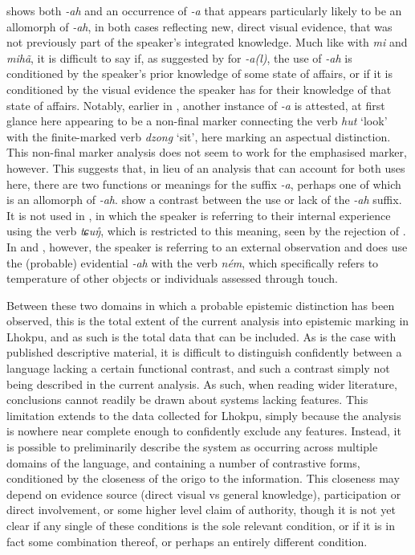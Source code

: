  shows both \textit{-ah} and an occurrence of \textit{-a} that appears particularly likely to be an allomorph of \textit{-ah}, in both cases reflecting new, direct visual evidence, that was not previously part of the speaker's integrated knowledge. Much like with \textit{mi} and \textit{mihã}, it is difficult to say if, as suggested by  for \textit{-a(l)}, the use of \textit{-ah} is conditioned by the speaker's prior knowledge of some state of affairs, or if it is conditioned by the visual evidence the speaker has for their knowledge of that state of affairs. Notably, earlier in , another instance of \textit{-a} is attested, at first glance here appearing to be a non-final marker connecting the verb \textit{hut} `look' with the finite-marked verb \textit{dzong} `sit', here marking an aspectual distinction. This non-final marker analysis does not seem to work for the emphasised marker, however. This suggests that, in lieu of an analysis that can account for both uses here, there are two functions or meanings for the suffix \textit{-a}, perhaps one of which is an allomorph of \textit{-ah}.  show a contrast between the use or lack of the \textit{-ah} suffix. It is not used in , in which the speaker is referring to their internal experience using the verb \textit{tɕuŋ̊}, which is restricted to this meaning, seen by the rejection of . In  and , however, the speaker is referring to an external observation and does use the (probable) evidential \textit{-ah} with the verb \textit{ném}, which specifically refers to temperature of other objects or individuals assessed through touch.

Between these two domains in which a probable epistemic distinction has been observed, this is the total extent of the current analysis into epistemic marking in Lhokpu, and as such is the total data that can be included. As is the case with published descriptive material, it is difficult to distinguish confidently between a language lacking a certain functional contrast, and such a contrast simply not being described in the current analysis. As such, when reading wider literature, conclusions cannot readily be drawn about systems lacking features. This limitation extends to the data collected for Lhokpu, simply because the analysis is nowhere near complete enough to confidently exclude any features. Instead, it is possible to preliminarily describe the system as occurring across multiple domains of the language, and containing a number of contrastive forms, conditioned by the closeness of the origo to the information. This closeness may depend on evidence source (direct visual vs general knowledge), participation or direct involvement, or some higher level claim of authority, though it is not yet clear if any single of these conditions is the sole relevant condition, or if it is in fact some combination thereof, or perhaps an entirely different condition.


